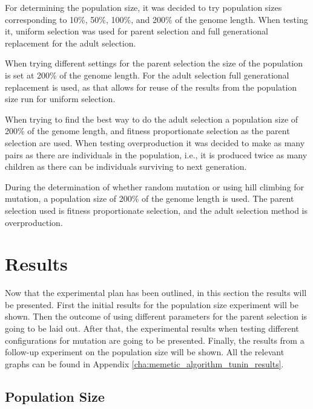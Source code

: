 For determining the population size, it was decided to try population sizes corresponding to 10\%, 50\%, 100\%, and 200\% of the genome length. When testing it, uniform selection was used for parent selection and full generational replacement for the adult selection.

When trying different settings for the parent selection the size of the population is set at 200\% of the genome length. For the adult selection full generational replacement is used, as that allows for reuse of the results from the population size run for uniform selection.

When trying to find the best way to do the adult selection a population size of 200\% of the genome length, and fitness proportionate selection as the parent selection are used. When testing overproduction it was decided to make as many pairs as there are individuals in the population, i.e., it is produced twice as many children as there can be individuals surviving to next generation.

During the determination of whether random mutation or using hill climbing for mutation, a population size of 200\% of the genome length is used. The parent selection used is fitness proportionate selection, and the adult selection method is overproduction.



\section{Results} %
\label{sec:results}

Now that the experimental plan has been outlined, in this section the results will be presented. First the initial results for the population size experiment will be shown. Then the outcome of using different parameters for the parent selection is going to be laid out. After that, the experimental results when testing different configurations for mutation are going to be presented. Finally, the results from a follow-up experiment on the population size will be shown. All the relevant graphs can be found in Appendix \ref{cha:memetic_algorithm_tunin_results}.

\subsection{Population Size} %
\label{sub:population_size}

